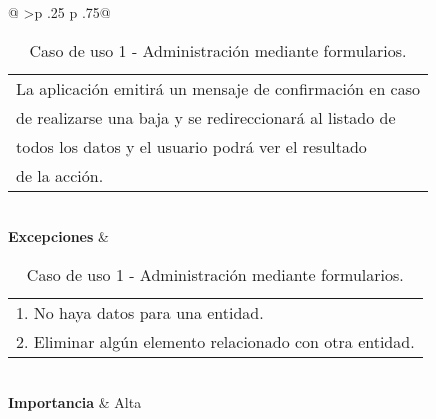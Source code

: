 \begin{table}[h]
\begin{tabular}{@{}
		>{}p {.25\textwidth} p {.75\textwidth}@{}}
\begin{tabular}[c]{@{}l@{}}
									    La aplicación emitirá un mensaje de confirmación en caso \\
									    de realizarse una baja y se redireccionará al listado de \\
									    todos los datos y el usuario podrá ver el resultado \\ 
									    de la acción. \\ 
								   \end{tabular} \\ \midrule
		\textbf{Excepciones}     & \begin{tabular}[c]{@{}l@{}}
										1. No haya datos para una entidad.\\ 
										2. Eliminar algún elemento relacionado con otra entidad.
								   \end{tabular} \\ \midrule
		\textbf{Importancia}     & Alta \\ \bottomrule
	\end{tabular}
	\caption{Caso de uso 1 - Administración mediante formularios.}
\end{table}


